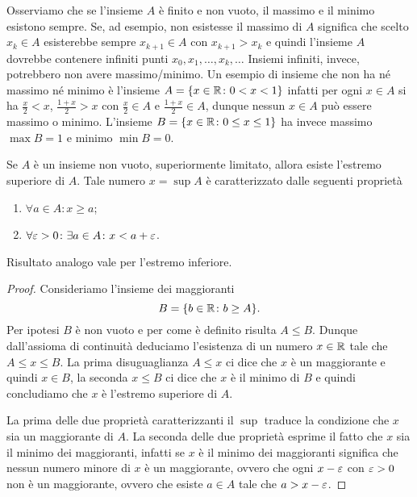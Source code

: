 Osserviamo che se l'insieme $A$ è finito e non vuoto,
il massimo e il minimo esistono
sempre.
Se, ad esempio, non esistesse il massimo di $A$ significa che scelto
$x_k\in A$ esisterebbe sempre $x_{k+1}\in A$ con $x_{k+1} > x_k$ e quindi l'insieme
$A$ dovrebbe contenere infiniti punti $x_0,x_1, \dots, x_k,\dots $
Insiemi infiniti, invece, potrebbero non avere massimo/minimo.
Un esempio di insieme che non ha né massimo né minimo è
l'insieme $A = {\left\{ x\in {\mathbb R}\colon 0<x<1 \right\}}$ infatti per ogni
$x\in A$ si ha $\frac x 2<x$, $\frac{1+x}{2}>x$
con $\frac x 2\in A$ e $\frac{1+x}{2}\in A$,
dunque nessun $x\in A$ può essere
massimo o minimo. L'insieme $B={\left\{ x\in {\mathbb R} \colon 0\le x \le 1 \right\}}$
ha invece massimo $\max B= 1$ e minimo $\min B=0$.

\begin{theorem}%
  \label{th:sup}%
  \mymark{**}%
  Se $A$ è un insieme non vuoto,
  superiormente limitato, allora esiste l'estremo superiore di $A$.
  Tale numero $x=\sup A$ è caratterizzato dalle seguenti proprietà
  \begin{enumerate}
  \item $\forall a\in A\colon x \ge a$;
  \item $\forall \varepsilon>0\colon \exists a\in A \colon x < a + \varepsilon$.
  \end{enumerate}

  Risultato analogo vale per l'estremo inferiore.
  \end{theorem}
  \begin{proof}
  \mymark{*}
  Consideriamo l'insieme dei maggioranti
  \[
  B = {\left\{  b\in {\mathbb R} \colon b \ge A \right\}}.
  \]
  Per ipotesi $B$ è non vuoto e per come è definito risulta $A\le B$.
  Dunque dall'assioma di continuità deduciamo l'esistenza di un numero $x\in {\mathbb R}$
  tale che $A\le x \le B$. La prima disuguaglianza $A\le x$ ci dice che $x$ è un
  maggiorante e quindi $x\in B$, la seconda $x\le B$ ci dice che $x$ è il minimo
  di $B$ e quindi concludiamo che $x$ è l'estremo superiore di $A$.

  La prima delle due proprietà caratterizzanti il $\sup$ traduce la condizione
  che $x$ sia un maggiorante di $A$. La seconda delle due proprietà esprime il
  fatto che $x$ sia il minimo dei maggioranti, infatti se $x$ è il minimo
  dei maggioranti significa che nessun numero minore di $x$ è un maggiorante, ovvero
  che ogni $x-\varepsilon$ con $\varepsilon>0$ non è un maggiorante, ovvero
  che esiste $a\in A$ tale che $a > x-\varepsilon$.
\end{proof}

